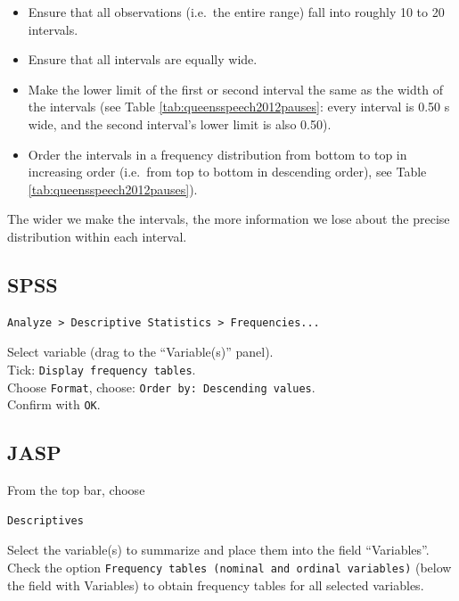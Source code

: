 \documentclass[
]{book}
\begin{document}
\begin{itemize}
\item
  Ensure that all observations (i.e.~the entire range) fall into
  roughly 10 to 20 intervals.
\item
  Ensure that all intervals are equally wide.
\item
  Make the lower limit of the first or second interval the same as
  the width of the intervals (see
  Table \ref{tab:queensspeech2012pauses}: every interval is 0.50 s
  wide, and the second interval's lower limit is also 0.50).
\item
  Order the intervals in a frequency distribution from bottom
  to top in increasing order (i.e.~from top to bottom in
  descending order), see
  Table \ref{tab:queensspeech2012pauses}).
\end{itemize}

The wider we make the intervals, the more information we lose
about the precise distribution within each interval.

\hypertarget{spss-1}{%
\subsection{SPSS}\label{spss-1}}

\begin{verbatim}
Analyze > Descriptive Statistics > Frequencies...
\end{verbatim}

Select variable (drag to the ``Variable(s)'' panel).\\
Tick: \texttt{Display\ frequency\ tables}.\\
Choose \texttt{Format}, choose: \texttt{Order\ by:\ Descending\ values}.\\
Confirm with \texttt{OK}.\\

\hypertarget{jasp-1}{%
\subsection{JASP}\label{jasp-1}}

From the top bar, choose

\begin{verbatim}
Descriptives
\end{verbatim}

Select the variable(s) to summarize and place them into the field ``Variables''. Check the option \texttt{Frequency\ tables\ (nominal\ and\ ordinal\ variables)} (below the field with Variables) to obtain frequency tables for all selected variables.
\end{document}
